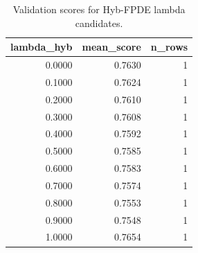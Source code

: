 \begin{table}[t]
\caption{Validation scores for Hyb-FPDE lambda candidates.}
\label{tab:lambda_distribution_computed}
\centering
\begin{tabular}{rrr}
\toprule
lambda\_hyb & mean\_score & n\_rows \\
\midrule
0.0000 & 0.7630 & 1 \\
0.1000 & 0.7624 & 1 \\
0.2000 & 0.7610 & 1 \\
0.3000 & 0.7608 & 1 \\
0.4000 & 0.7592 & 1 \\
0.5000 & 0.7585 & 1 \\
0.6000 & 0.7583 & 1 \\
0.7000 & 0.7574 & 1 \\
0.8000 & 0.7553 & 1 \\
0.9000 & 0.7548 & 1 \\
1.0000 & 0.7654 & 1 \\
\bottomrule
\end{tabular}

\end{table}
